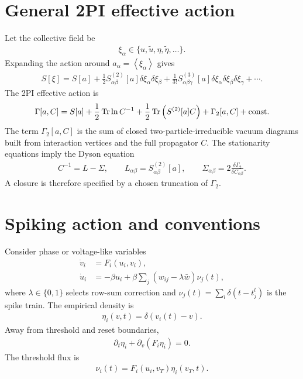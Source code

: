 \documentclass[pre,preprint,preprintnumbers,aps,eqsecnum,superscriptaddress,notitlepage,showpacs,floatfix]{revtex4-1}
\newcommand{\Tr}{\operatorname{Tr}}
\newcommand{\avg}[1]{\left\langle #1 \right\rangle}
\begin{document}
\section{General 2PI effective action}
\label{sec:general_2PI}

Let the collective field be
\begin{align}
\xi_\alpha\in\{u,\tilde u,\eta,\tilde\eta,\ldots\}.
\end{align}
Expanding the action around $a_\alpha=\avg{\xi_\alpha}$ gives
\begin{align}
S[\xi]
=S[a]
+\frac12 S^{(2)}_{\alpha\beta}[a]\delta\xi_\alpha\delta\xi_\beta
+\frac{1}{3!}S^{(3)}_{\alpha\beta\gamma}[a]
\delta\xi_\alpha\delta\xi_\beta\delta\xi_\gamma
+\cdots .
\label{eq:vertex_expansion}
\end{align}
The 2PI effective action is
\begin{align}
\Gamma[a,C]
=
S[a]
+\frac12\Tr\ln C^{-1}
+\frac12\Tr\left(S^{(2)}[a]C\right)
+\Gamma_2[a,C]
+{\rm const}.
\label{eq:2PI_general}
\end{align}
The term $\Gamma_2[a,C]$ is the sum of closed two-particle-irreducible vacuum
diagrams built from interaction vertices and the full propagator $C$.  The
stationarity equations imply the Dyson equation
\begin{align}
C^{-1}=L-\Sigma,
\qquad
L_{\alpha\beta}=S^{(2)}_{\alpha\beta}[a],
\qquad
\Sigma_{\alpha\beta}=2\frac{\delta\Gamma_2}{\delta C_{\alpha\beta}}.
\label{eq:dyson_general}
\end{align}
A closure is therefore specified by a chosen truncation of $\Gamma_2$.

\section{Spiking action and conventions}
\label{sec:spiking_action}

Consider phase or voltage-like variables
\begin{align}
\dot v_i &= F_i(u_i,v_i),\\
\dot u_i &= -\beta u_i
+
\beta\sum_j\left(w_{ij}-\lambda\bar w\right)\nu_j(t),
\label{eq:u_dynamics_spiking}
\end{align}
where $\lambda\in\{0,1\}$ selects row-sum correction and
$\nu_j(t)=\sum_l\delta(t-t_j^l)$ is the spike train.  The empirical density is
\begin{align}
\eta_i(v,t)=\delta(v_i(t)-v).
\end{align}
Away from threshold and reset boundaries,
\begin{align}
\partial_t\eta_i+\partial_v(F_i\eta_i)=0.
\label{eq:klimontovich}
\end{align}
The threshold flux is
\begin{align}
\nu_i(t)=F_i(u_i,v_T)\eta_i(v_T,t).
\end{align}
\end{document}

